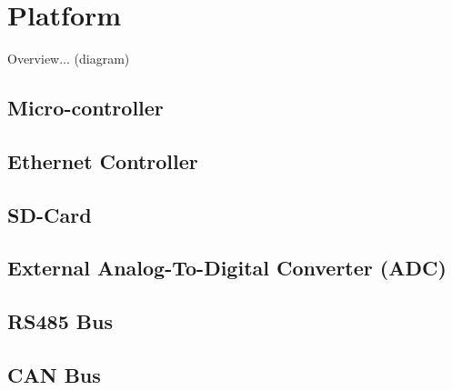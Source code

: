 

\chapter{Platform}

Overview... (diagram)

\section{Micro-controller}

\section{Ethernet Controller}

\section{SD-Card}

\section{External Analog-To-Digital Converter (ADC)}

\section{RS485 Bus}

\section{CAN Bus}
